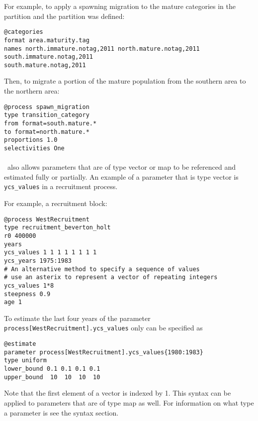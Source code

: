 For example, to apply a spawning migration to the mature categories in the partition and the partition was defined:

{\small{\begin{verbatim}
@categories
format area.maturity.tag
names north.immature.notag,2011 north.mature.notag,2011 south.immature.notag,2011
south.mature.notag,2011
\end{verbatim}}}

Then, to migrate a portion of the mature population from the southern area to the northern area:

{\small{\begin{verbatim}
@process spawn_migration
type transition_category
from format=south.mature.*
to format=north.mature.*
proportions 1.0
selectivities One
\end{verbatim}}}

\paragraph*{\label{sec:Parameters}}

\CNAME\ also allows parameters that are of type vector or map to be referenced and estimated fully or partially. An example of a parameter that is type vector is \texttt{ycs\_values} in a recruitment process.

For example, a recruitment block:

{\small{\begin{verbatim}
@process WestRecruitment
type recruitment_beverton_holt
r0 400000
years
ycs_values 1 1 1 1 1 1 1 1
ycs_years 1975:1983
# An alternative method to specify a sequence of values
# use an asterix to represent a vector of repeating integers
ycs_values 1*8
steepness 0.9
age 1
\end{verbatim}}}

To estimate the last four years of the parameter \texttt{process[WestRecruitment].ycs\_values} only can be specified as

{\small{\begin{verbatim}
@estimate
parameter process[WestRecruitment].ycs_values{1980:1983}
type uniform
lower_bound 0.1 0.1 0.1 0.1
upper_bound  10  10  10  10
\end{verbatim}}}

Note that the first element of a vector is indexed by 1. This syntax can be applied to parameters that are of type map as well. For information on what type a parameter is see the syntax section.

